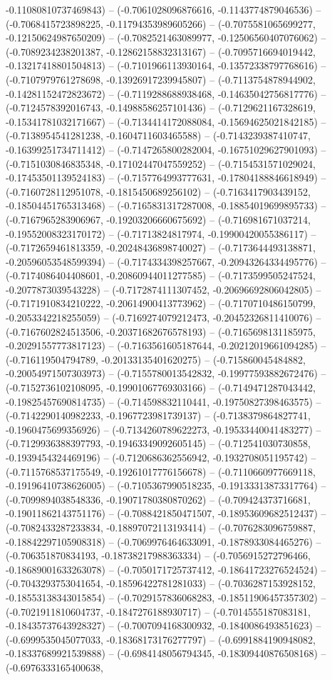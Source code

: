 -0.11080810737469843) -- (-0.7061028096876616, -0.1143774879046536) -- (-0.7068415723898225, -0.11794353989605266) -- (-0.7075581065699277, -0.12150624987650209) -- (-0.7082521463089977, -0.12506560407076062) -- (-0.7089234238201387, -0.12862158832313167) -- (-0.7095716694019442, -0.13217418801504813) -- (-0.7101966113930164, -0.13572338797768616) -- (-0.7107979761278698, -0.13926917239945807) -- (-0.7113754878944902, -0.14281152472823672) -- (-0.7119288688938468, -0.14635042756817776) -- (-0.7124578392016743, -0.14988586257101436) -- (-0.7129621167328619, -0.15341781032171667) -- (-0.7134414172088084, -0.15694625021842185) -- (-0.7138954541281238, -0.1604711603465588) -- (-0.7143239387410747, -0.16399251734711412) -- (-0.7147265800282004, -0.16751029627901093) -- (-0.7151030846835348, -0.17102447047559252) -- (-0.7154531571029024, -0.17453501139524183) -- (-0.7157764993777631, -0.17804188846618949) -- (-0.7160728112951078, -0.1815450689256102) -- (-0.7163417903439152, -0.18504451765313468) -- (-0.7165831317287008, -0.18854019699895733) -- (-0.7167965283906967, -0.19203206660675692) -- (-0.716981671037214, -0.19552008323170172) -- (-0.71713824817974, -0.19900420055386117) -- (-0.7172659461813359, -0.20248436898740027) -- (-0.7173644493138871, -0.20596053548599394) -- (-0.7174334398257667, -0.20943264334495776) -- (-0.7174086404408601, -0.20860944011277585) -- (-0.7173599505247524, -0.2077873039543228) -- (-0.7172874111307452, -0.20696692806042805) -- (-0.7171910834210222, -0.20614900413773962) -- (-0.7170710486150799, -0.2053342218255059) -- (-0.7169274079212473, -0.20452326811410076) -- (-0.7167602824513506, -0.20371682676578193) -- (-0.7165698131185975, -0.20291557773817123) -- (-0.7163561605187644, -0.20212019661094285) -- (-0.716119504794789, -0.20133135401620275) -- (-0.715860045484882, -0.20054971507303973) -- (-0.7155780013542832, -0.19977593882672476) -- (-0.7152736102108095, -0.19901067769303166) -- (-0.7149471287043442, -0.19825457690814735) -- (-0.714598832110441, -0.19750827398463575) -- (-0.7142290140982233, -0.1967723981739137) -- (-0.7138379864827741, -0.1960475699356926) -- (-0.7134260789622273, -0.19533440041483277) -- (-0.7129936388397793, -0.19463349092605145) -- (-0.712541030730858, -0.1939454324469196) -- (-0.7120686362556942, -0.1932708051195742) -- (-0.7115768537175549, -0.19261017776156678) -- (-0.7110660977669118, -0.19196410738626005) -- (-0.7105367990518235, -0.19133313873317764) -- (-0.7099894038548336, -0.19071780380870262) -- (-0.709424373716681, -0.19011862143751176) -- (-0.7088421850471507, -0.18953609682512437) -- (-0.7082433287233834, -0.18897072113193414) -- (-0.7076283096759887, -0.18842297105908318) -- (-0.7069976464633091, -0.1878933084465276) -- (-0.706351870834193, -0.18738217988363334) -- (-0.7056915272796466, -0.18689001633263078) -- (-0.7050171725737412, -0.18641723276524524) -- (-0.7043293753041654, -0.18596422781281033) -- (-0.7036287153928152, -0.18553138343015854) -- (-0.7029157836068283, -0.18511906457357302) -- (-0.7021911810604737, -0.1847276188930717) -- (-0.7014555187083181, -0.18435737643928327) -- (-0.7007094168300932, -0.1840086493851623) -- (-0.6999535045077033, -0.18368173176277797) -- (-0.6991884190948082, -0.18337689921539888) -- (-0.6984148056794345, -0.18309440876508168) -- (-0.6976333165400638, 